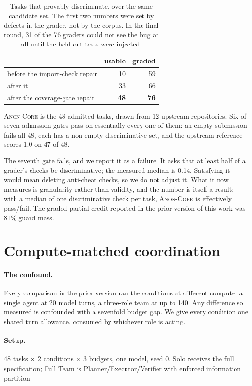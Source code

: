 \documentclass[11pt]{article}
\newcommand{\core}{\textsc{Anon-Core}}
\newcommand{\core}{\textsc{TeamBench-Core}}
\begin{document}
\begin{table}[t]
\centering\small
\begin{tabular}{lrr}
\toprule
 & usable & graded \\
\midrule
before the import-check repair          & 10 & 59 \\
after it                                & 33 & 66 \\
after the coverage-gate repair          & \textbf{48} & \textbf{76} \\
\bottomrule
\end{tabular}
\caption{Tasks that provably discriminate, over the same candidate set. The
first two numbers were set by defects in the grader, not by the corpus. In the
final round, 31 of the 76 graders could not see the bug at all until the
held-out tests were injected.}
\label{tab:validation}
\end{table}

\core{} is the 48 admitted tasks, drawn from 12 upstream repositories. Six of
seven admission gates pass on essentially every one of them: an empty submission
fails all 48, each has a non-empty discriminative set, and the upstream
reference scores 1.0 on 47 of 48.

The seventh gate fails, and we report it as a failure. It asks that at least
half of a grader's checks be discriminative; the measured median is 0.14.
Satisfying it would mean deleting anti-cheat checks, so we do not adjust it.
What it now measures is granularity rather than validity, and the number is
itself a result: with a median of one discriminative check per task, \core{} is
effectively pass/fail. The graded partial credit reported in the prior version
of this work was 81\% guard mass.

\section{Compute-matched coordination}
\label{sec:budget}

\paragraph{The confound.} Every comparison in the prior version ran the
conditions at different compute: a single agent at 20 model turns, a three-role
team at up to 140. Any difference so measured is confounded with a sevenfold
budget gap. We give every condition one shared turn allowance, consumed by
whichever role is acting.

\paragraph{Setup.} 48 tasks $\times$ 2 conditions $\times$ 3 budgets, one model,
seed 0. Solo receives the full specification; Full Team is
Planner/Executor/Verifier with enforced information partition.
\end{document}
